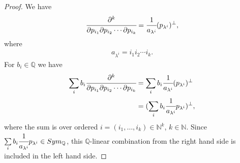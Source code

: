 \documentclass[8pt]{extarticle}
\newcommand{\N}{\mathbb{N}}
\newcommand{\Q}{\mathbb{Q}}
\newcommand{\<}{\langle}
\renewcommand{\>}{\rangle}
\theoremstyle{definition}
\begin{document}
\begin{proof}
  We have
  \begin{align*}
    \cfrac{\partial^k}{\partial p_{i_1} \partial p_{i_2} \cdots \partial p_{i_k}} = \cfrac{1}{a_{\lambda^i}} (p_{\lambda^i})^{\perp},
  \end{align*}
  where
  \begin{align*}
    a_{\lambda^i} = i_1 i_2 \cdots i_k.
  \end{align*}
  For $b_{i} \in \Q$ we have
  \begin{align*}
    \sum\limits_{i} b_{i}\cfrac{\partial^k}{\partial p_{i_1} \partial p_{i_2} \cdots \partial p_{i_k}}
    &=
    \sum\limits_{i} b_{i}\cfrac{1}{a_{\lambda^i}} (p_{\lambda^i})^{\perp} \\
    &=
    (\sum\limits_{i} b_{i}\cfrac{1}{a_{\lambda^i}}p_{\lambda^i})^{\perp},
  \end{align*}
  where the sum is over ordered $i=(i_1, \dots, i_k) \in \N^k$, $k \in \N$. Since $\sum\limits_{i} b_{i}\cfrac{1}{a_{\lambda^i}}p_{\lambda^i} \in Sym_{\Q}$, this $\Q$-linear combination from the right hand side is included in the left hand side.
\end{proof}
\end{document}
